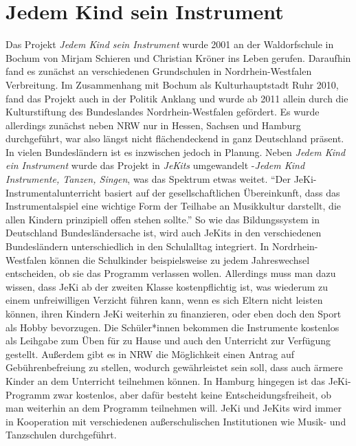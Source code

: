 \section{Jedem Kind sein Instrument}

Das Projekt \emph{Jedem Kind sein Instrument} wurde 2001 an der Waldorfschule in
Bochum von Mirjam Schieren und Christian Kröner ins Leben gerufen. Daraufhin
fand es zunächst an verschiedenen Grundschulen in Nordrhein-Westfalen
Verbreitung. Im Zusammenhang mit Bochum als Kulturhauptstadt Ruhr 2010, fand das
Projekt auch in der Politik Anklang und wurde ab 2011 allein durch die
Kulturstiftung des Bundeslandes Nordrhein-Westfalen gefördert. Es wurde
allerdings zunächst neben NRW nur in Hessen, Sachsen und Hamburg durchgeführt,
war also längst nicht flächendeckend in ganz Deutschland präsent. In vielen
Bundesländern ist es inzwischen jedoch in Planung. Neben \emph{Jedem Kind ein
Instrument} wurde das Projekt in \emph{JeKits} umgewandelt -\emph{Jedem Kind
Instrumente, Tanzen, Singen}, was das Spektrum etwas weitet. \enquote{Der
JeKi-Instrumentalunterricht basiert auf der gesellschaftlichen Übereinkunft,
dass das Instrumentalspiel eine wichtige Form der Teilhabe an Musikkultur
darstellt, die allen Kindern prinzipiell offen stehen
sollte.}\autocite[94]{krupp_schleussner:jeki} So wie das Bildungssystem in
Deutschland Bundesländersache ist, wird auch JeKits in den verschiedenen
Bundesländern unterschiedlich in den Schulalltag integriert. In
Nordrhein-Westfalen können die Schulkinder beispielsweise zu jedem Jahreswechsel
entscheiden, ob sie das Programm verlassen wollen.
\autocite[95]{krupp_schleussner:jeki} Allerdings muss man dazu wissen, dass JeKi
ab der zweiten Klasse kostenpflichtig ist, was wiederum zu einem unfreiwilligen
Verzicht führen kann, wenn es sich Eltern nicht leisten können, ihren Kindern
JeKi weiterhin zu finanzieren, oder eben doch den Sport als Hobby bevorzugen.
Die Schüler*innen bekommen die Instrumente kostenlos als Leihgabe zum Üben für
zu Hause und auch den Unterricht zur Verfügung gestellt. Außerdem gibt es in NRW
die Möglichkeit einen Antrag auf Gebührenbefreiung zu stellen, wodurch
gewährleistet sein soll, dass auch ärmere Kinder an dem Unterricht teilnehmen
können. In Hamburg hingegen ist das JeKi-Programm zwar kostenlos, aber dafür
besteht keine Entscheidungsfreiheit, ob man weiterhin an dem Programm teilnehmen
will.
\autocite[95]{krupp_schleussner:jeki}
JeKi und JeKits wird immer in Kooperation mit verschiedenen außerschulischen
Institutionen wie Musik- und Tanzschulen durchgeführt.

